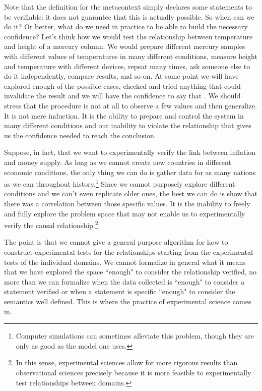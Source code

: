 \documentclass[11pt,letterpaper,fleqn]{memoir} %
\begin{document}
Note that the definition for the metacontext simply declares some statements to be verifiable: it does not guarantee that this is actually possible. So when can we do it? Or better, what do we need in practice to be able to build the necessary confidence? Let's think how we would test the relationship between temperature and height of a mercury column. We would prepare different mercury samples with different values of temperatures in many different conditions, measure height and temperature with different devices, repeat many times, ask someone else to do it independently, compare results, and so on. At some point we will have explored enough of the possible cases, checked and tried anything that could invalidate the result and we will have the confidence to say that . We should stress that the procedure is not at all to observe a few values and then generalize. It is not mere induction. It is the ability to prepare and control the system in many different conditions and our inability to violate the relationship that gives us the confidence needed to reach the conclusion.

Suppose, in fact, that we want to experimentally verify the link between inflation and money supply. As long as we cannot create new countries in different economic conditions, the only thing we can do is gather data for as many nations as we can throughout history.\footnote{Computer simulations can sometimes alleviate this problem, though they are only as good as the model one uses.} Since we cannot purposely explore different conditions and we can't even replicate older ones, the best we can do is show that there was a correlation between those specific values. It is the inability to freely and fully explore the problem space that may not enable us to experimentally verify the causal relationship.\footnote{In this sense, experimental sciences allow for more rigorous results than observational sciences precisely because it is more feasible to experimentally test relationships between domains.}

The point is that we cannot give a general purpose algorithm for how to construct experimental tests for the relationships starting from the experimental tests of the individual domains. We cannot formalize in general what it means that we have explored the space ``enough" to consider the relationship verified, no more than we can formalize when the data collected is ``enough" to consider a statement verified or when a statement is specific ``enough" to consider the semantics well defined. This is where the practice of experimental science comes in.
\end{document}
